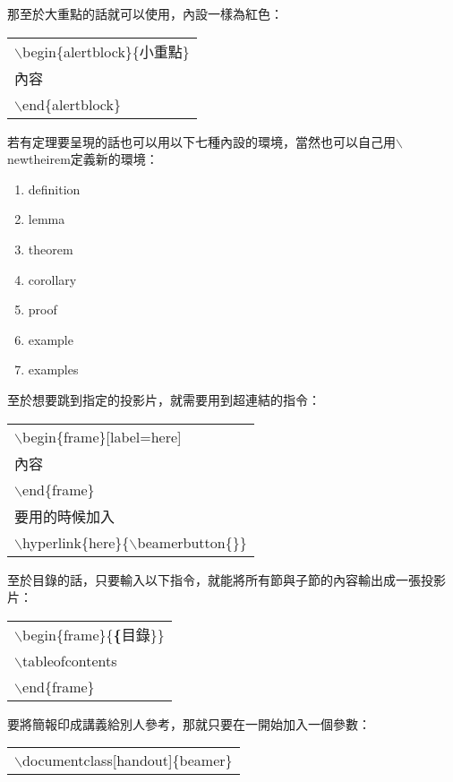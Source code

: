 那至於大重點的話就可以使用，內設一樣為紅色：
\begin{center}\colorbox{slight}{\begin{tabular}{p{}}
	$\backslash$begin\{alertblock\}\{小重點\}\\
	內容\\
	$\backslash$end\{alertblock\}\\
\end{tabular}}
\end{center}
若有定理要呈現的話也可以用以下七種內設的環境，當然也可以自己用$\backslash$newtheirem定義新的環境：
\begin{enumerate}
\item definition
\item lemma
\item theorem
\item corollary
\item proof
\item example
\item examples
\end{enumerate}
至於想要跳到指定的投影片，就需要用到超連結的指令：
\begin{center}\colorbox{slight}{\begin{tabular}{p{}}
    $\backslash$begin\{frame\}[label=here]\\
    內容\\
    $\backslash$end\{frame\}\\
    要用的時候加入\\
    $\backslash$hyperlink\{here\}\{$\backslash$beamerbutton\{\}\}\\
\end{tabular}}
\end{center}
至於目錄的話，只要輸入以下指令，就能將所有節與子節的內容輸出成一張投影片：
\begin{center}\colorbox{slight}{\begin{tabular}{p{}}
    $\backslash$begin\{frame\}\{\textbf\{目錄\}\}\\
	$\backslash$tableofcontents\\
    $\backslash$end\{frame\}\\
\end{tabular}}
\end{center}
要將簡報印成講義給別人參考，那就只要在一開始加入一個參數：
\begin{center}\colorbox{slight}{\begin{tabular}{p{}}
    $\backslash$documentclass[handout]\{beamer\}
\end{tabular}}
\end{center}
